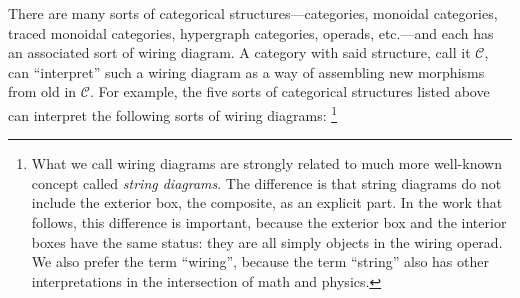 \documentclass[11pt, article, oneside]{memoir}
\theoremstyle{plain}
\theoremstyle{definition}
\theoremstyle{remark}
\newcommand{\cat}[1]{\mathcal{#1}}
\begin{document}
There are many sorts of categorical structures---categories, monoidal categories, traced monoidal categories, hypergraph categories, operads, etc.---and each has an associated sort of wiring diagram. A category with said structure, call it $\cat{C}$, can ``interpret'' such a wiring diagram as a way of assembling new morphisms from old in $\cat{C}$. For example, the five sorts of categorical structures listed above can interpret the following sorts of wiring diagrams:%
\footnote{What we call wiring diagrams are strongly related to much more well-known concept called \emph{string diagrams}. The difference is that string diagrams do not include the exterior box, the composite, as an explicit part. In the work that follows, this difference is important, because the exterior box and the interior boxes have the same status: they are all simply objects in the wiring operad. We also prefer the term ``wiring'', because the term ``string'' also has other interpretations in the intersection of math and physics.}
\end{document}
